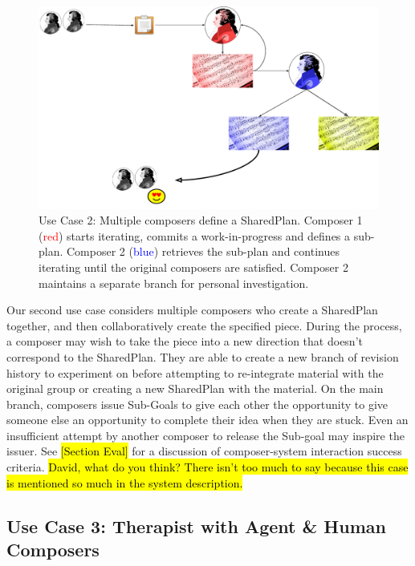 \documentclass[final,authoryear,5p,times,twocolumn]{elsarticle}
\begin{document}
\begin{figure}
	\includegraphics[scale=0.35]{multicomposer.pdf}
	\caption{Use Case 2: Multiple composers define a SharedPlan. Composer 1 (\textcolor{red}{red}) starts
	iterating, commits a work-in-progress and defines a sub-plan. Composer 2 (\textcolor{blue}{blue}) retrieves the sub-plan and continues iterating until the original composers are
	satisfied. Composer 2 maintains a separate branch for personal investigation.}
	\label{fig:multicomposer}
\end{figure}

Our second use case considers multiple composers who create a SharedPlan together, and then collaboratively create the specified piece. During the process, a composer may wish to take the piece into a new direction that doesn't correspond to the SharedPlan. They are able to create a new branch of revision history to experiment on before attempting to re-integrate material with the original group or creating a new SharedPlan with the material. On the main branch, composers issue Sub-Goals to give each other the opportunity to give someone else an opportunity to complete their idea when they are stuck. Even an insufficient attempt by another composer to release the Sub-goal may inspire the issuer. See \hl{[Section Eval]} for a discussion of composer-system interaction success criteria. \hl{David, what do you think? There isn't too much to say because this case is mentioned so much in the system description.}

\subsection{Use Case 3: Therapist with Agent \& Human Composers}
\label{subsec:therapy1}
\end{document}
